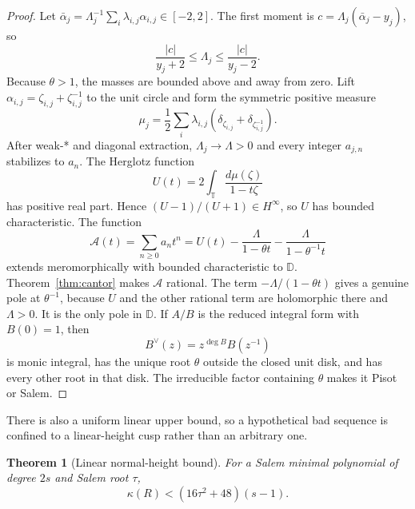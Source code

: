 \documentclass[11pt,reqno]{amsart}
\newtheorem{theorem}{Theorem}[section]
\theoremstyle{definition}
\theoremstyle{remark}
\newcommand{\D}{\mathbb D}
\newcommand{\T}{\mathbb T}
\begin{document}
\begin{proof}
Let $\bar\alpha_j=\Lambda_j^{-1}\sum_i\lambda_{i,j}\alpha_{i,j}\in[-2,2]$.
The first moment is
$c=\Lambda_j(\bar\alpha_j-y_j)$, so
\begin{equation}\label{eq:massbound}
 \frac{|c|}{y_j+2}\le\Lambda_j\le\frac{|c|}{y_j-2}.
\end{equation}
Because $\theta>1$, the masses are bounded above and away from zero.  Lift
$\alpha_{i,j}=\zeta_{i,j}+\zeta_{i,j}^{-1}$ to the unit circle and form the
symmetric positive measure
\[
 \mu_j=\frac12\sum_i\lambda_{i,j}
 (\delta_{\zeta_{i,j}}+\delta_{\zeta_{i,j}^{-1}}).
\]
After weak-* and diagonal extraction, $\Lambda_j\to\Lambda>0$ and every
integer $a_{j,n}$ stabilizes to $a_n$.  The Herglotz function
\[
 U(t)=2\int_{\T}\frac{d\mu(\zeta)}{1-t\zeta}
\]
has positive real part.  Hence $(U-1)/(U+1)\in H^\infty$, so $U$ has
bounded characteristic.  The function
\begin{equation}\label{eq:Aseries}
 \mathcal A(t)=\sum_{n\ge0}a_nt^n
 =U(t)-\frac{\Lambda}{1-\theta t}
       -\frac{\Lambda}{1-\theta^{-1}t}
\end{equation}
extends meromorphically with bounded characteristic to $\D$.
Theorem~\ref{thm:cantor} makes $\mathcal A$ rational.  The term
$-\Lambda/(1-\theta t)$ gives a genuine pole at $\theta^{-1}$, because $U$
and the other rational term are holomorphic there and $\Lambda>0$.  It is the
only pole in $\D$.  If $A/B$ is the reduced integral form with $B(0)=1$,
then
\[
 B^\vee(z)=z^{\deg B}B(z^{-1})
\]
is monic integral, has the unique root $\theta$ outside the closed unit disk,
and has every other root in that disk.  The irreducible factor containing
$\theta$ makes it Pisot or Salem.
\end{proof}

There is also a uniform linear upper bound, so a hypothetical bad sequence
is confined to a linear-height cusp rather than an arbitrary one.

\begin{theorem}[Linear normal-height bound]\label{thm:linearheight}
For a Salem minimal polynomial of degree $2s$ and Salem root $\tau$,
\begin{equation}\label{eq:linearheight}
 \kappa(R)<(16\tau^2+48)(s-1).
\end{equation}
\end{theorem}
\end{document}
